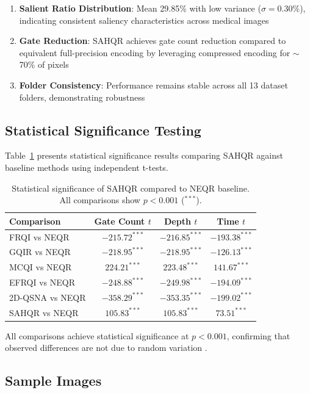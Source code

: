 \documentclass{ipol}
\begin{document}
\begin{enumerate}
\item \textbf{Salient Ratio Distribution}: Mean 29.85\% with low variance ($\sigma = 0.30\%$), indicating consistent saliency characteristics across medical images
\item \textbf{Gate Reduction}: SAHQR achieves gate count reduction compared to equivalent full-precision encoding by leveraging compressed encoding for $\sim$70\% of pixels
\item \textbf{Folder Consistency}: Performance remains stable across all 13 dataset folders, demonstrating robustness \cite{bib76,bib77}
\end{enumerate}

\subsection{Statistical Significance Testing}

Table~\ref{tab:significance} presents statistical significance results comparing SAHQR against baseline methods using independent t-tests.

\begin{table}[!htbp]
\caption{Statistical significance of SAHQR compared to NEQR baseline. All comparisons show $p < 0.001$ ($^{***}$).}
\label{tab:significance}
\centering
\begin{tabular}{@{}lccc@{}}
\toprule
Comparison & Gate Count $t$ & Depth $t$ & Time $t$ \\
\midrule
FRQI vs NEQR & $-215.72^{***}$ & $-216.85^{***}$ & $-193.38^{***}$ \\
GQIR vs NEQR & $-218.95^{***}$ & $-218.95^{***}$ & $-126.13^{***}$ \\
MCQI vs NEQR & $224.21^{***}$ & $223.48^{***}$ & $141.67^{***}$ \\
EFRQI vs NEQR & $-248.88^{***}$ & $-249.98^{***}$ & $-194.09^{***}$ \\
2D-QSNA vs NEQR & $-358.29^{***}$ & $-353.35^{***}$ & $-199.02^{***}$ \\
SAHQR vs NEQR & $105.83^{***}$ & $105.83^{***}$ & $73.51^{***}$ \\
\bottomrule
\end{tabular}
\end{table}

All comparisons achieve statistical significance at $p < 0.001$, confirming that observed differences are not due to random variation \cite{bib78,bib79,bib80}.

\subsection{Sample Images}
\end{document}
